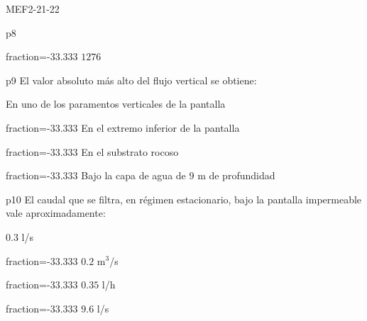 \documentclass[a4paper]{article}
\begin{document}
\begin{quiz}{MEF2-21-22}
\begin{multi}{p8}
	\item[fraction=-33.333] $1276$
\end{multi}
\begin{multi}{p9}
	El valor absoluto m\'as alto del flujo vertical se obtiene:
	\item* En uno de los paramentos verticales de la pantalla
	\item[fraction=-33.333] En el extremo inferior de la pantalla
	\item[fraction=-33.333] En el substrato rocoso
	\item[fraction=-33.333] Bajo la capa de agua de $9$ m de profundidad
\end{multi}
\begin{multi}{p10}
El caudal que se filtra, en r\'egimen estacionario, bajo la pantalla impermeable
vale aproximadamente:
	\item* $0.3$ l/s
	\item[fraction=-33.333] $0.2$ m$^3$/s
	\item[fraction=-33.333] $0.35$ l/h
	\item[fraction=-33.333] $9.6$ l/s
\end{multi}
\end{quiz}
\end{document}
